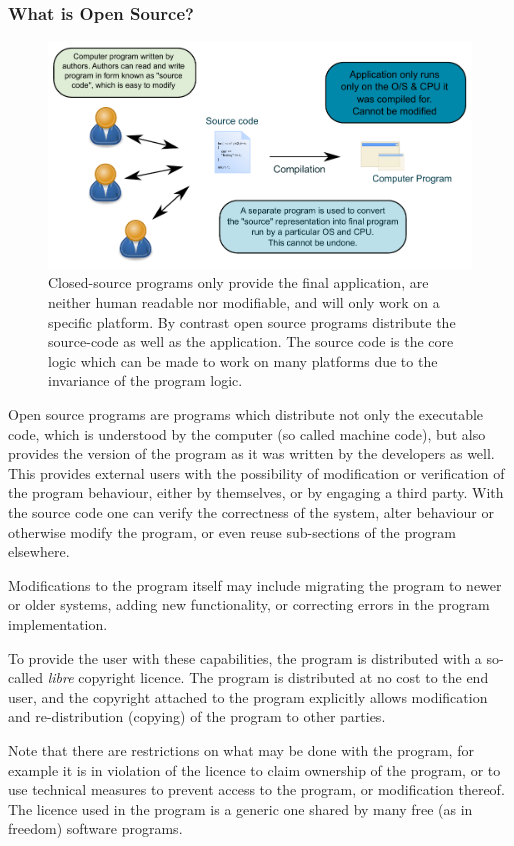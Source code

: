 \documentclass[10pt]{article}
\begin{document}
\subsubsection{What is Open Source?}
\begin{figure}
 \includegraphics[width=0.7 \textwidth,keepaspectratio=true]{./figures/compilation.pdf}
 \caption{Closed-source programs only provide the final application, are neither human readable nor modifiable, and will only work on a specific platform. By contrast open source programs distribute the source-code as well as the application. The source code is the core logic which can be made to work on many platforms due to the invariance of the program logic.}
\label{fig:compilation}
\end{figure}
Open source programs are programs which distribute not only the executable code, which is understood by the computer (so called machine code), but also provides the version of the program as it was written by the developers as well. This provides external users with the possibility of modification or verification of the program behaviour, either by themselves, or by engaging a third party. With the source code one can verify the correctness of the system, alter behaviour or otherwise modify the program, or even reuse sub-sections of the program elsewhere. 

Modifications to the program itself may include migrating the program to newer or older systems, adding new functionality, or correcting errors in the program implementation.  
 
To provide the user with these capabilities, the program is distributed with a so-called \textit{libre} copyright licence. The program is distributed at no cost to the end user, and the copyright attached to the program explicitly allows modification and re-distribution (copying) of the program to other parties.

Note that there are restrictions on what may be done with the program, for example it is in violation of the licence to claim ownership of the program, or to use technical measures to prevent access to the program, or modification thereof. The licence used in the program is a generic one shared by many free (as in freedom) software programs. 
\end{document}
